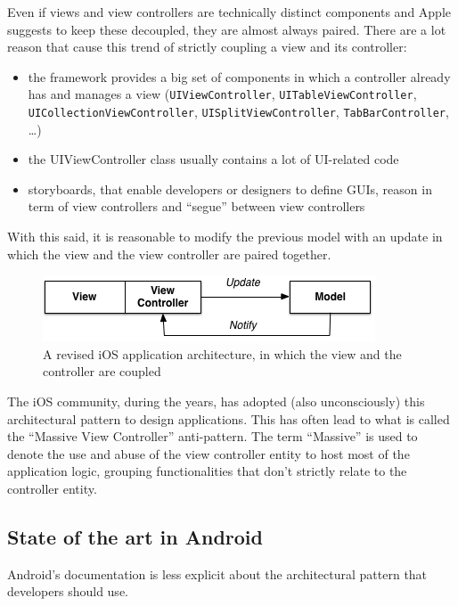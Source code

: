 Even if views and view controllers are technically distinct components
and Apple suggests to keep these decoupled, they are almost always
paired. There are a lot reason that cause this trend of strictly
coupling a view and its controller:

\begin{itemize}
\itemsep1pt\parskip0pt
\item
  the framework provides a big set of components in which a controller
  already has and manages a view (\texttt{UIViewController},
  \texttt{UITableViewController}, \texttt{UICollectionViewController},
  \texttt{UISplitViewController}, \texttt{TabBarController}, \ldots{})
\item
  the UIViewController class usually contains a lot of UI-related code
\item
  storyboards, that enable developers or designers to define GUIs,
  reason in term of view controllers and ``segue'' between view
  controllers
\end{itemize}

With this said, it is reasonable to modify the previous model with an
update in which the view and the view controller are paired together.

\begin{figure}[htbp]
\centering
\includegraphics[scale=0.75]{imgs/real_mvc.png}
\caption{A revised iOS application architecture, in which the view and
the controller are coupled}
\end{figure}

The iOS community, during the years, has adopted (also unconsciously)
this architectural pattern to design applications. This has often lead
to what is called the ``Massive View Controller'' anti-pattern. The term
``Massive'' is used to denote the use and abuse of the view controller
entity to host most of the application logic, grouping functionalities
that don't strictly relate to the controller entity.

\subsection{State of the art in
Android}\label{state-of-the-art-in-android}

Android's documentation is less explicit about the architectural pattern
that developers should use.


